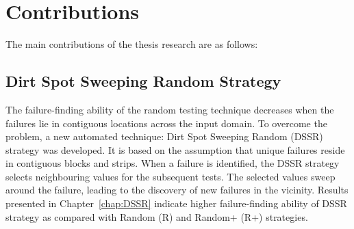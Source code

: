 


\section{Contributions}
The main contributions of the thesis research are as follows: 

\subsection{Dirt Spot Sweeping Random Strategy}

The failure-finding ability of the random testing technique decreases when the failures lie in contiguous locations across the input domain. To overcome the problem, a new automated technique: Dirt Spot Sweeping Random (DSSR) strategy was developed. It is based on the assumption that unique failures reside in contiguous blocks and strips. When a failure is identified, the DSSR strategy selects neighbouring values for the subsequent tests. The selected values sweep around the failure, leading to the discovery of new failures in the vicinity. Results presented in Chapter~\ref{chap:DSSR} indicate higher failure-finding ability of DSSR strategy as compared with Random (R) and Random+ (R+) strategies.

